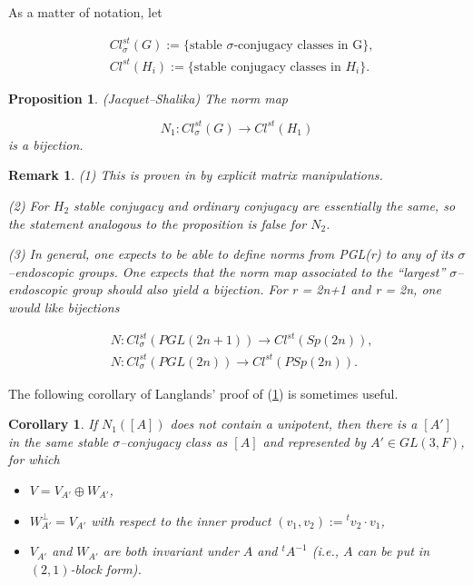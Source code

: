 \documentclass[12pt,letterpaper]{amsart}
\numberwithin{equation}{section}
\newtheorem{corollary}[theorem]{Corollary}
\newtheorem{proposition}[theorem]{Proposition}
\newtheorem{remark}{Remark}
\theoremstyle{definition}
\theoremstyle{plain}
\begin{document}
As a matter of notation, let

\[
\begin{split}
&Cl^{st}_{\sigma}(G) :=\{\text{stable $\sigma$-conjugacy classes in G}\},\\
&Cl^{st}(H_i) := \{\text{stable conjugacy classes in $H_i$}\}.
\end{split}
\]

\begin{proposition} (Jacquet--Shalika)
\label{prop:1.13} 
The norm map

\[
N_1 : Cl^{st}_{\sigma}(G) \rightarrow Cl^{st}(H_1)
\]
is a bijection.
\end{proposition}

\begin{remark} 

(1) This is proven in \cite{LaUn} by explicit
matrix manipulations.
\newline

(2) For $H_2$ stable conjugacy and ordinary conjugacy
are essentially the same, so the statement analogous to the 
proposition is false for $N_2$. 
\newline

(3) In general, one expects to be able to define norms from PGL(r) to
any of its $\sigma$--endoscopic groups. One expects that the norm map
associated to the ``largest'' $\sigma$--endoscopic group should also yield a
bijection. For r = 2n+1 and r = 2n, one would like bijections

\[
\begin{split}
&N: Cl^{st}_{\sigma}(PGL(2n+1)) \rightarrow Cl^{st}(Sp(2n)),\\
&N: Cl^{st}_{\sigma}(PGL(2n)) \rightarrow Cl^{st}(PSp(2n)).
\end{split}
\]
\end{remark}
 
The following corollary of Langlands' proof of (\ref{prop:1.13}) 
is sometimes useful.

\begin{corollary}
\label{cor:1.14} 
If $N_1([A])$ does not contain a unipotent, then 
there is a $[A']$ in the same stable $\sigma$--conjugacy class 
as $[A]$ and 
represented by $A' \in GL(3,F)$, for which

\begin{itemize}

\item[(a)] 
$V = V_{A'} \oplus W_{A'}$,

\item[(b)] 
$W_{A'}^{\bot} = V_{A'}$ with respect to the inner product
$(v_1,v_2):={^{t}v_2}\cdot v_1$,

\item[(c)] 
$V_{A'}$ and $W_{A'}$ are both invariant under $A$ and 
${^{t}A^{-1}}$ (i.e., $A$ can be put in $(2,1)$-block form).
\end{itemize}
\end{corollary}
\end{document}
